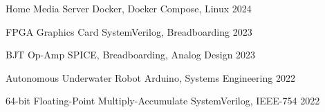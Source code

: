 

\begin{cvhonors}

  \cvhonor
    {Home Media Server} %
    {Docker, Docker Compose, Linux} %
    {} %
    {2024} %

  \cvhonor
    {FPGA Graphics Card} %
    {SystemVerilog, Breadboarding} %
    {} %
    {2023} %

  \cvhonor
    {BJT Op-Amp} %
    {SPICE, Breadboarding, Analog Design} %
    {} %
    {2023} %

  \cvhonor
    {Autonomous Underwater Robot}
    {Arduino, Systems Engineering}
    {}
    {2022}

  \cvhonor
    {64-bit Floating-Point Multiply-Accumulate} %
    {SystemVerilog, IEEE-754} %
    {} %
    {2022} %

\end{cvhonors}
